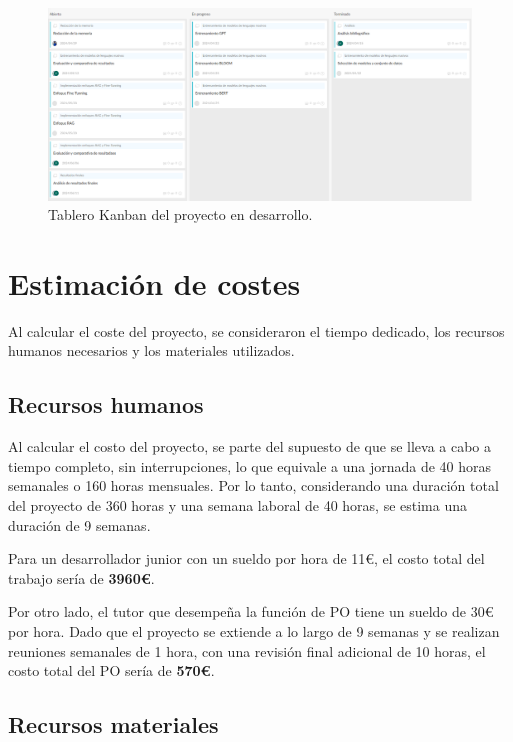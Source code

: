 \begin{figure}[h]
  \centering \includegraphics[width=\linewidth,height=\textheight,keepaspectratio]{imaxes/3_TableroKanban.png}
  \caption{Tablero Kanban del proyecto en desarrollo.}
  \label{fig:3_TableroKanban}
\end{figure}

\section{Estimación de costes}
Al calcular el coste del proyecto, se consideraron el tiempo dedicado, los recursos humanos necesarios y los materiales utilizados.

\subsection{Recursos humanos}
Al calcular el costo del proyecto, se parte del supuesto de que se lleva a cabo a tiempo completo, sin interrupciones, lo que equivale a una jornada de 40 horas semanales o 160 horas mensuales. Por lo tanto, considerando una duración total del proyecto de 360 horas y una semana laboral de 40 horas, se estima una duración de 9 semanas.

Para un desarrollador junior con un sueldo por hora de 11€, el costo total del trabajo sería de \textbf{3960€}.

Por otro lado, el tutor que desempeña la función de \acrfull{PO} tiene un sueldo de 30€ por hora. Dado que el proyecto se extiende a lo largo de 9 semanas y se realizan reuniones semanales de 1 hora, con una revisión final adicional de 10 horas, el costo total del \acrshort{PO} sería de \textbf{570€}.

\subsection{Recursos materiales}

